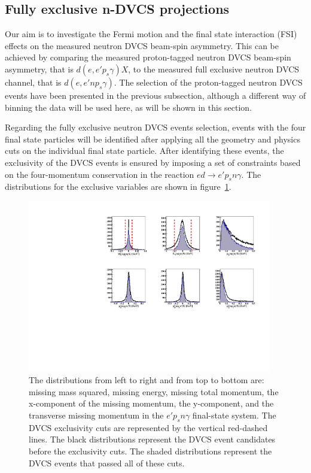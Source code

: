 \subsection{Fully exclusive n-DVCS projections}
Our aim is to investigate the Fermi motion and the final state interaction 
(FSI) effects on the measured neutron DVCS beam-spin asymmetry.  This can be 
achieved by comparing the measured proton-tagged neutron DVCS beam-spin 
asymmetry, that is $d(e,e'p_s\gamma)X$, to the measured full exclusive neutron 
DVCS channel, that is $d(e,e'np_s\gamma)$.  The selection of the proton-tagged 
neutron DVCS events have been presented in the previous subsection, although a 
different way of binning the data will be used here, as will be shown in this 
section. 

Regarding the fully exclusive neutron DVCS events selection, events with the 
four final state particles will be identified after applying all the geometry 
and physics cuts on the individual final state particle. After identifying 
these events, the exclusivity of the DVCS events is ensured by imposing a set 
of constraints based on the four-momentum conservation in the reaction 
$ed\rightarrow e'p_{s}n\gamma$.  The distributions for the exclusive variables 
are shown in figure~\ref{fig:fully_exclusive}.

\begin{figure}[htb]
  \centering
    \includegraphics[width=0.95\textwidth,clip]{figs_epngamma/pdf/epngamma_all_incoh_exc_cuts.pdf}
  \caption{
    The distributions from left to right and from top to bottom are:
    missing mass squared, missing energy, missing total momentum, the 
    x-component of the missing momentum, the y-component, and the transverse 
    missing momentum in the $e'p_{s}n\gamma$ final-state system. The DVCS 
    exclusivity cuts are represented by the vertical red-dashed lines. The 
    black distributions represent the DVCS event candidates before the 
    exclusivity cuts. The shaded distributions represent the DVCS events that 
    passed all of these cuts.
   \label{fig:fully_exclusive}}
\end{figure}

